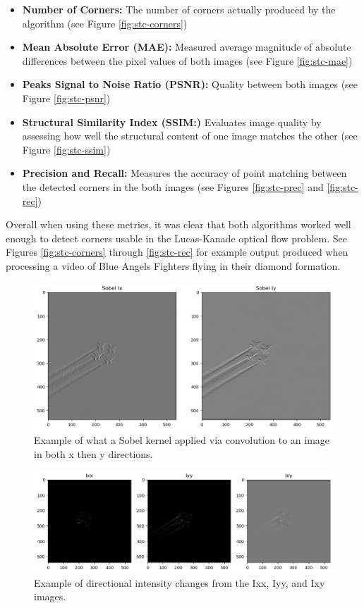 \documentclass[11pt, conference, letterpaper]{IEEEtran}
\begin{document}
\begin{itemize}
    \item \textbf{Number of Corners:} The number of corners actually produced by the algorithm (see Figure \ref{fig:stc-corners})
    \item \textbf{Mean Absolute Error (MAE):} Measured average magnitude of absolute differences between the pixel values of both images (see Figure \ref{fig:stc-mae})
    \item \textbf{Peaks Signal to Noise Ratio (PSNR):} Quality between both images (see Figure \ref{fig:stc-psnr})
    \item \textbf{Structural Similarity Index (SSIM:)} Evaluates image quality by assessing how well the structural content of one image matches the other (see Figure \ref{fig:stc-ssim})
    \item \textbf{Precision and Recall:} Measures the accuracy of point matching between the detected corners in the both images (see Figures \ref{fig:stc-prec} and \ref{fig:stc-rec})
\end{itemize}

Overall when using these metrics, it was clear that both algorithms worked well enough to detect corners usable in the Lucas-Kanade optical flow problem. See Figures \ref{fig:stc-corners} through \ref{fig:stc-rec} for example output produced when processing a video of Blue Angels Fighters flying in their diamond formation.

\onecolumn
\begin{figure}[t]
    \centering
    \includegraphics[width=0.6\linewidth]{images/gradients_sample.png}
    \caption{Example of what a Sobel kernel applied via convolution to an image in both x then y directions.}
    \label{fig:sobel_gradient}
\end{figure}

\begin{figure}[t]
    \centering
    \includegraphics[width=0.95\linewidth]{images/pre_gaussian_low_pass_filters.png}
    \caption{Example of directional intensity changes from the Ixx, Iyy, and Ixy images.}
    \label{fig:pre_gaussian_lpf}
\end{figure}
\end{document}
